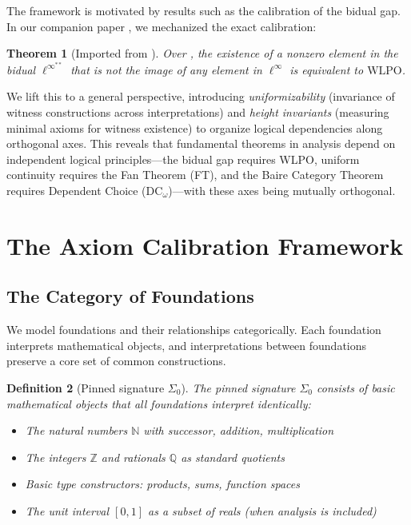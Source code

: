 \documentclass[11pt]{article}
\newtheorem{theorem}{Theorem}[section]
\newtheorem{definition}[theorem]{Definition}
\newcommand{\N}{\mathbb{N}}
\newcommand{\WLPO}{\mathrm{WLPO}}
\newcommand{\DCw}{\mathrm{DC}_\omega}
\newcommand{\BISH}{\mathrm{BISH}}
\newcommand{\SigmaZero}{\Sigma_{0}}
\newcommand{\linf}{\ell^\infty}
\begin{document}
The framework is motivated by results such as the calibration of the bidual gap. In our companion paper \cite{Paper2}, we mechanized the exact calibration:

\begin{theorem}[Imported from \cite{Paper2}]\label{thm:paper2}
Over \BISH, the existence of a nonzero element in the bidual $\linf^{**}$ that is not the image of any element in $\linf$ is equivalent to $\WLPO$.
\end{theorem}

We lift this to a general perspective, introducing \emph{uniformizability} (invariance of witness constructions across interpretations) and \emph{height invariants} (measuring minimal axioms for witness existence) to organize logical dependencies along orthogonal axes. This reveals that fundamental theorems in analysis depend on independent logical principles---the bidual gap requires WLPO, uniform continuity requires the Fan Theorem (FT), and the Baire Category Theorem requires Dependent Choice ($\DCw$)---with these axes being mutually orthogonal.

\section{The Axiom Calibration Framework}

\subsection{The Category of Foundations}

We model foundations and their relationships categorically. Each foundation interprets mathematical objects, and interpretations between foundations preserve a core set of common constructions.

\begin{definition}[Pinned signature \(\SigmaZero\)]
The \emph{pinned signature} $\SigmaZero$ consists of basic mathematical objects that all foundations interpret identically:
\begin{itemize}
\item The natural numbers $\N$ with successor, addition, multiplication
\item The integers $\mathbb{Z}$ and rationals $\mathbb{Q}$ as standard quotients
\item Basic type constructors: products, sums, function spaces
\item The unit interval $[0,1]$ as a subset of reals (when analysis is included)
\end{itemize}
\end{definition}
\end{document}
